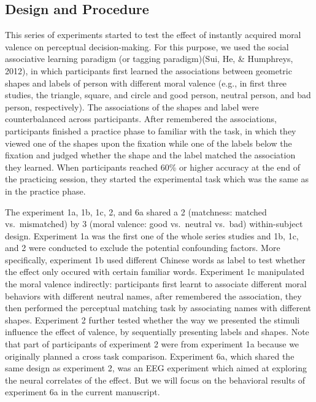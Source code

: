 \documentclass[
  english,
  man]{apa6}
\begin{document}
\hypertarget{design-and-procedure}{%
\subsection{Design and Procedure}\label{design-and-procedure}}

This series of experiments started to test the effect of instantly acquired moral valence on perceptual decision-making. For this purpose, we used the social associative learning paradigm (or tagging paradigm)(Sui, He, \& Humphreys, 2012), in which participants first learned the associations between geometric shapes and labels of person with different moral valence (e.g., in first three studies, the triangle, square, and circle and good person, neutral person, and bad person, respectively). The associations of the shapes and label were counterbalanced across participants. After remembered the associations, participants finished a practice phase to familiar with the task, in which they viewed one of the shapes upon the fixation while one of the labels below the fixation and judged whether the shape and the label matched the association they learned. When participants reached 60\% or higher accuracy at the end of the practicing session, they started the experimental task which was the same as in the practice phase.

The experiment 1a, 1b, 1c, 2, and 6a shared a 2 (matchness: matched vs.~mismatched) by 3 (moral valence: good vs.~neutral vs.~bad) within-subject design. Experiment 1a was the first one of the whole series studies and 1b, 1c, and 2 were conducted to exclude the potential confounding factors. More specifically, experiment 1b used different Chinese words as label to test whether the effect only occured with certain familiar words. Experiment 1c manipulated the moral valence indirectly: participants first learnt to associate different moral behaviors with different neutral names, after remembered the association, they then performed the perceptual matching task by associating names with different shapes. Experiment 2 further tested whether the way we presented the stimuli influence the effect of valence, by sequentially presenting labels and shapes. Note that part of participants of experiment 2 were from experiment 1a because we originally planned a cross task comparison. Experiment 6a, which shared the same design as experiment 2, was an EEG experiment which aimed at exploring the neural correlates of the effect. But we will focus on the behavioral results of experiment 6a in the current manuscript.
\end{document}
